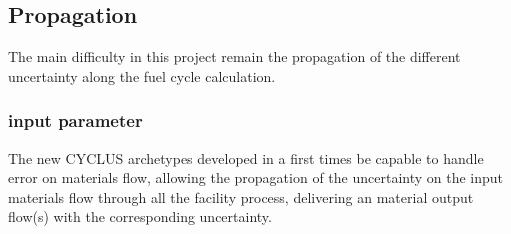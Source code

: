 \documentclass[dvips,12pt]{article}
\begin{document}
  


\subsection{Propagation} 
The main difficulty in this project remain the propagation of the different uncertainty along the fuel cycle calculation.
\subsubsection{input parameter}
The new CYCLUS archetypes developed in a first times be capable to handle error on materials flow, allowing the propagation of the uncertainty on the input materials flow through all the facility process, delivering an material output flow(s) with the corresponding uncertainty.
\end{document}
